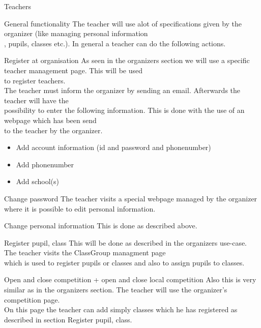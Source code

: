\begin{section}{Teachers}
    \begin{subsection}{General functionality}
	The teacher will use alot of specifications given by the organizer (like managing personal information\\
	, pupils, classes etc.). In general a teacher can do the following actions.\\
	\begin{subsubsection}{Register at organisation}
	As seen in the organizers section we will use a specific teacher management page. This will be used\\
	to register teachers.\\
	The teacher must inform the organizer by sending an email. Afterwards the teacher will have the\\
	possibility to enter the following information. This is done with the use of an webpage which has been send\\
	to the teacher by the organizer.
	\begin{itemize}
		\item Add account information (id and password and phonenumber)
		\item Add phonenumber
		\item Add school(s)
	\end{itemize}
	\end{subsubsection}
	\begin{subsubsection}{Change password}
	The teacher visits a special webpage managed by the organizer where it is possible to edit personal information.
	\end{subsubsection}
    \begin{subsubsection}{Change personal information}
	This is done as described above.
	\end{subsubsection}
	\begin{subsubsection}{Register pupil, class}
	This will be done as described in the organizers use-case. The teacher visits the ClassGroup managment page\\
	which is used to register pupils or classes and also to assign pupils to classes.
	\end{subsubsection}
	\begin{subsubsection}{Open and close competition + open and close local competition}
	Also this is very similar as in the organizers section. The teacher will use the organizer's competition page.\\
	On this page the teacher can add simply classes which he has registered as described in section Register pupil, class.\\

\end{subsubsection}
\end{subsection}
\end{section}
